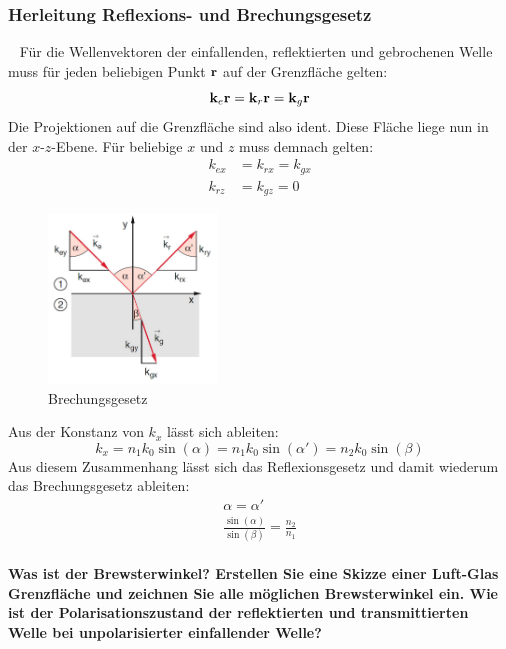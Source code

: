 \documentclass[a4paper, 11pt, ngerman, parskip=half-]{scrartcl}
\begin{document}
\subsubsection*{Herleitung Reflexions- und Brechungsgesetz}~
%
Für die Wellenvektoren der einfallenden, reflektierten und gebrochenen
Welle muss für jeden beliebigen Punkt $\vb{r}$ auf der Grenzfläche
gelten:
%
\begin{equation}
    \vb{k}_e \vb{r} = \vb{k}_r \vb{r} = \vb{k}_g \vb{r}
\end{equation}
%
Die Projektionen auf die Grenzfläche sind also ident. Diese Fläche liege nun in der $x$-$z$-Ebene.
Für beliebige $x$ und $z$ muss demnach gelten:
%
\begin{equation}
    \begin{split}
        k_{ex} &= k_{rx} = k_{gx} \\
        k_{rz} &= k_{gz} = 0
    \end{split}
\end{equation}
%
\begin{figure}[H]
    \centering
    \begin{samepage}
        \includegraphics[width=0.4\textwidth]{image/15/brechungsgesetz_hohenau.png}
        \caption{Brechungsgesetz}
        \label{fig:brechungsgesetz}
    \end{samepage}
\end{figure}
%
Aus der Konstanz von $k_x$ lässt sich ableiten:
%
\begin{equation}
    k_x = n_1 k_0 \sin(\alpha) = n_1 k_0 \sin(\alpha') = n_2 k_0 \sin(\beta)
\end{equation}
%
Aus diesem Zusammenhang lässt sich das Reflexionsgesetz und damit wiederum das Brechungsgesetz ableiten:
%
\begin{align}
    \alpha = \alpha' \\
    \frac{\sin(\alpha)}{\sin(\beta)} = \frac{n_2}{n_1}
\end{align}
%
\paragraph{Was ist der Brewsterwinkel? Erstellen Sie eine Skizze einer Luft-Glas Grenzfläche und zeichnen Sie alle
    möglichen Brewsterwinkel ein. Wie ist der Polarisationszustand der reflektierten und transmittierten Welle bei
    unpolarisierter einfallender Welle?}~\\
\end{document}
